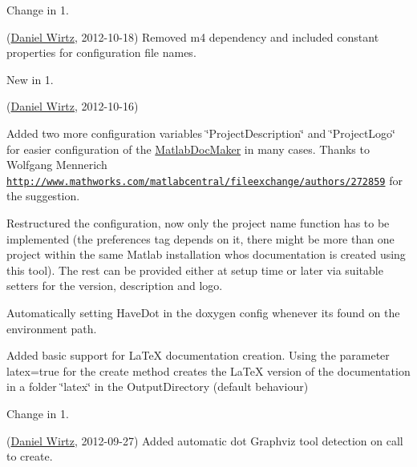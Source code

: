 \begin{DoxyRefDesc}{Change in 1.}
\item[\hyperlink{changelog1_4__changelog1_4000001}{Change in 1.\+4}](\hyperlink{developers_dw}{Daniel Wirtz}, 2012-\/10-\/18) Removed {\ttfamily m4} dependency and included constant properties for configuration file names.\end{DoxyRefDesc}


\begin{DoxyRefDesc}{New in 1.}
\item[\hyperlink{newfeat1_4__newfeat1_4000001}{New in 1.\+4}](\hyperlink{developers_dw}{Daniel Wirtz}, 2012-\/10-\/16)
\begin{DoxyItemize}
\item Added two more configuration variables \char`\"{}\+Project\+Description\char`\"{} and \char`\"{}\+Project\+Logo\char`\"{} for easier configuration of the \hyperlink{class_matlab_doc_maker}{Matlab\+Doc\+Maker} in many cases. Thanks to Wolfgang Mennerich \href{http://www.mathworks.com/matlabcentral/fileexchange/authors/272859}{\tt http\+://www.\+mathworks.\+com/matlabcentral/fileexchange/authors/272859} for the suggestion.
\item Restructured the configuration, now only the project name function has to be implemented (the preferences tag depends on it, there might be more than one project within the same Matlab installation whos documentation is created using this tool). The rest can be provided either at setup time or later via suitable setters for the version, description and logo.
\item Automatically setting Have\+Dot in the doxygen config whenever its found on the environment path.
\item Added basic support for La\+Te\+X documentation creation. Using the parameter {\ttfamily latex}=true for the create method creates the La\+Te\+X version of the documentation in a folder \char`\"{}latex\char`\"{} in the Output\+Directory (default behaviour)
\end{DoxyItemize}\end{DoxyRefDesc}


\begin{DoxyRefDesc}{Change in 1.}
\item[\hyperlink{changelog1_4__changelog1_4000002}{Change in 1.\+4}](\hyperlink{developers_dw}{Daniel Wirtz}, 2012-\/09-\/27) Added automatic dot Graphviz tool detection on call to create.\end{DoxyRefDesc}


